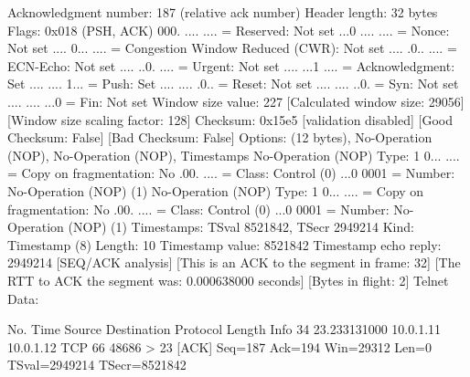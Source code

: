     Acknowledgment number: 187    (relative ack number)
    Header length: 32 bytes
    Flags: 0x018 (PSH, ACK)
        000. .... .... = Reserved: Not set
        ...0 .... .... = Nonce: Not set
        .... 0... .... = Congestion Window Reduced (CWR): Not set
        .... .0.. .... = ECN-Echo: Not set
        .... ..0. .... = Urgent: Not set
        .... ...1 .... = Acknowledgment: Set
        .... .... 1... = Push: Set
        .... .... .0.. = Reset: Not set
        .... .... ..0. = Syn: Not set
        .... .... ...0 = Fin: Not set
    Window size value: 227
    [Calculated window size: 29056]
    [Window size scaling factor: 128]
    Checksum: 0x15e5 [validation disabled]
        [Good Checksum: False]
        [Bad Checksum: False]
    Options: (12 bytes), No-Operation (NOP), No-Operation (NOP), Timestamps
        No-Operation (NOP)
            Type: 1
                0... .... = Copy on fragmentation: No
                .00. .... = Class: Control (0)
                ...0 0001 = Number: No-Operation (NOP) (1)
        No-Operation (NOP)
            Type: 1
                0... .... = Copy on fragmentation: No
                .00. .... = Class: Control (0)
                ...0 0001 = Number: No-Operation (NOP) (1)
        Timestamps: TSval 8521842, TSecr 2949214
            Kind: Timestamp (8)
            Length: 10
            Timestamp value: 8521842
            Timestamp echo reply: 2949214
    [SEQ/ACK analysis]
        [This is an ACK to the segment in frame: 32]
        [The RTT to ACK the segment was: 0.000638000 seconds]
        [Bytes in flight: 2]
Telnet
    Data: 

No.     Time           Source                Destination           Protocol Length Info
     34 23.233131000   10.0.1.11             10.0.1.12             TCP      66     48686 > 23 [ACK] Seq=187 Ack=194 Win=29312 Len=0 TSval=2949214 TSecr=8521842

